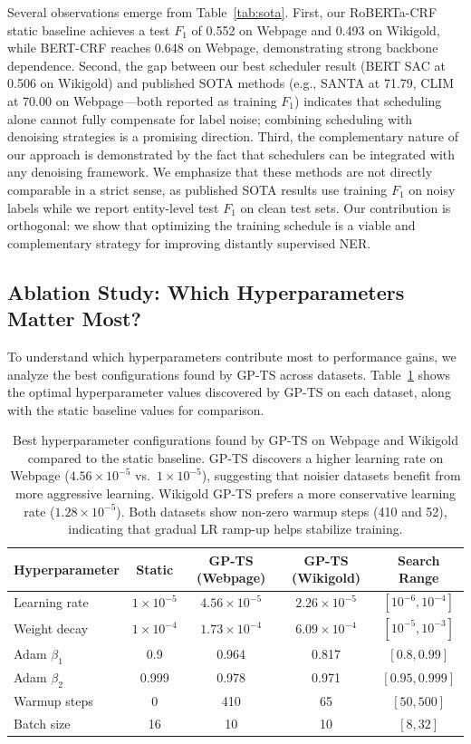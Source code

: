 \documentclass[11pt]{article}
\begin{document}
Several observations emerge from Table~\ref{tab:sota}. First, our RoBERTa-CRF static baseline achieves a test $F_1$ of 0.552 on Webpage and 0.493 on Wikigold, while BERT-CRF reaches 0.648 on Webpage, demonstrating strong backbone dependence. Second, the gap between our best scheduler result (BERT SAC at 0.506 on Wikigold) and published SOTA methods (e.g., SANTA at 71.79, CLIM at 70.00 on Webpage\textit{---}both reported as training $F_1$) indicates that scheduling alone cannot fully compensate for label noise; combining scheduling with denoising strategies is a promising direction. Third, the complementary nature of our approach is demonstrated by the fact that schedulers can be integrated with any denoising framework. We emphasize that these methods are not directly comparable in a strict sense, as published SOTA results use training $F_1$ on noisy labels while we report entity-level test $F_1$ on clean test sets. Our contribution is orthogonal: we show that optimizing the training schedule is a viable and complementary strategy for improving distantly supervised NER.

\subsection{Ablation Study: Which Hyperparameters Matter Most?}

To understand which hyperparameters contribute most to performance gains, we analyze the best configurations found by GP-TS across datasets. Table~\ref{tab:ablation} shows the optimal hyperparameter values discovered by GP-TS on each dataset, along with the static baseline values for comparison.

\begin{table}[t]
\centering
\small
\begin{tabular}{@{}lcccc@{}}
\toprule
\textbf{Hyperparameter} & \textbf{Static} & \textbf{GP-TS (Webpage)} & \textbf{GP-TS (Wikigold)} & \textbf{Search Range} \\
\midrule
Learning rate & $1 \times 10^{-5}$ & $4.56 \times 10^{-5}$ & $2.26 \times 10^{-5}$ & $[10^{-6}, 10^{-4}]$ \\
Weight decay & $1 \times 10^{-4}$ & $1.73 \times 10^{-4}$ & $6.09 \times 10^{-4}$ & $[10^{-5}, 10^{-3}]$ \\
Adam $\beta_1$ & 0.9 & 0.964 & 0.817 & $[0.8, 0.99]$ \\
Adam $\beta_2$ & 0.999 & 0.978 & 0.971 & $[0.95, 0.999]$ \\
Warmup steps & 0 & 410 & 65 & $[50, 500]$ \\
Batch size & 16 & 10 & 10 & $[8, 32]$ \\
\bottomrule
\end{tabular}
\caption{Best hyperparameter configurations found by GP-TS on Webpage and Wikigold compared to the static baseline. GP-TS discovers a higher learning rate on Webpage ($4.56 \times 10^{-5}$ vs.\ $1 \times 10^{-5}$), suggesting that noisier datasets benefit from more aggressive learning. Wikigold GP-TS prefers a more conservative learning rate ($1.28 \times 10^{-5}$). Both datasets show non-zero warmup steps (410 and 52), indicating that gradual LR ramp-up helps stabilize training.}
\label{tab:ablation}
\end{table}
\end{document}
